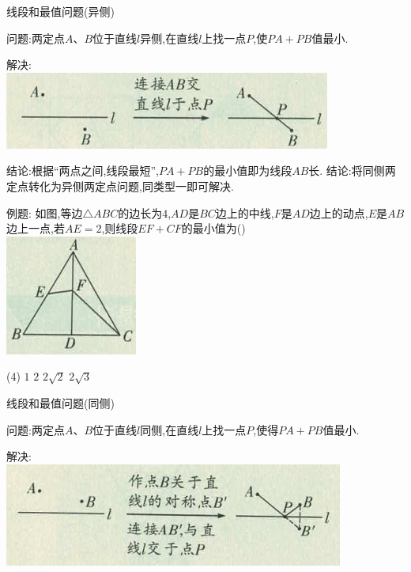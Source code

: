 \documentclass[cn,blue,12pt]{elegantbook}
\begin{document}
\begin{zsyd}
\item 线段和最值问题(异侧)
    \begin{zsyd}
    \item 问题:两定点\(A、B\)位于直线\(l\)异侧,在直线\(l\)上找一点\(P\),使\(PA+PB\)值最小.
    \item 解决:\\
        \includegraphics[width=0.6\linewidth]{pic/20200518001.png}
    \item 结论:根据“两点之间,线段最短”,\(PA+PB\)的最小值即为线段\(AB\)长.
        结论:将同侧两定点转化为异侧两定点问题,同类型一即可解决.
    \item 例题: 如图,等边\(\triangle ABC\)的边长为\(4\),\(AD\)是\(BC\)边上的中线,\(F\)是\(AD\)边上的动点,\(E\)是\(AB\)边上一点,若\(AE=2\),则线段\(EF + CF\)的最小值为(\qquad)\\
        \includegraphics[width=0.3\linewidth]{pic/20200518004.png}
        \begin{tasks}(4)
            \task \(1\)
            \task \(2\)
            \task \(2\sqrt{2}\)
            \task \(2\sqrt{3}\)
        \end{tasks}
    \end{zsyd}
\item 线段和最值问题(同侧)
    \begin{zsyd}
    \item 问题:两定点\(A、B\)位于直线\(l\)同侧,在直线\(l\)上找一点\(P\),使得\(PA + PB\)值最小.
    \item 解决:\\
        \includegraphics[width=0.6\linewidth]{pic/20200518002.png}

\end{zsyd}
\end{zsyd}
\end{document}
